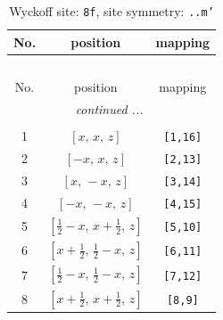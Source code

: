 \documentclass[fleqn,8pt]{jsarticle}
\begin{document}
\begin{longtable}{ccc}
\caption{Wyckoff site: {\tt 8f}, site symmetry: {\tt ..m'}}
 \\
 \hline \hline
No. & position & mapping \\ \hline \endfirsthead

\multicolumn{2}{l}{\tablename\ \thetable{}} \\
 \hline \hline
No. & position & mapping \\ \hline \endhead

 \hline \hline
\multicolumn{2}{r}{\footnotesize\it continued ...} \\ \endfoot

 \hline \hline
\multicolumn{2}{r}{} \\ \endlastfoot

1 & $\left[ x,\, x,\, z \right]$ & {\tt [1,16]} \\ \hline
2 & $\left[ - x,\, x,\, z \right]$ & {\tt [2,13]} \\ \hline
3 & $\left[ x,\, - x,\, z \right]$ & {\tt [3,14]} \\ \hline
4 & $\left[ - x,\, - x,\, z \right]$ & {\tt [4,15]} \\ \hline
5 & $\left[ \frac{1}{2} - x,\, x + \frac{1}{2},\, z \right]$ & {\tt [5,10]} \\ \hline
6 & $\left[ x + \frac{1}{2},\, \frac{1}{2} - x,\, z \right]$ & {\tt [6,11]} \\ \hline
7 & $\left[ \frac{1}{2} - x,\, \frac{1}{2} - x,\, z \right]$ & {\tt [7,12]} \\ \hline
8 & $\left[ x + \frac{1}{2},\, x + \frac{1}{2},\, z \right]$ & {\tt [8,9]} \\
\end{longtable}
\renewcommand{\arraystretch}{1.2}
\end{document}
